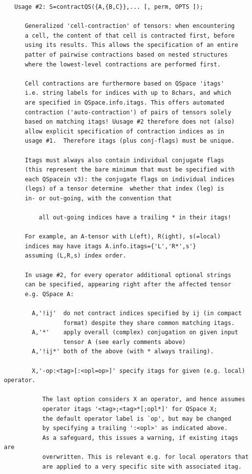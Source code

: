 \documentclass[twoside,12pt]{article}
\begin{document}
\begin{verbatim}
   Usage #2: S=contractQS({A,{B,C}},... [, perm, OPTS ]);
 
      Generalized 'cell-contraction' of tensors: when encountering
      a cell, the content of that cell is contracted first, before
      using its results. This allows the specification of an entire
      patter of pairwise contractions based on nested structures
      where the lowest-level contractions are performed first.
 
      Cell contractions are furthermore based on QSpace 'itags'
      i.e. string labels for indices with up to 8chars, and which
      are specified in QSpace.info.itags. This offers automated
      contraction ('auto-contraction') of pairs of tensors solely
      based on matching itags! Uusage #2 therefore does not (also)
      allow explicit specification of contraction indices as in
      usage #1.  Therefore itags (plus conj-flags) must be unique.
 
      Itags must always also contain individual conjugate flags
      (this represent the bare minimum that must be specified with
      each QSpacein v3): the conjugate flags on individual indices
      (legs) of a tensor determine  whether that index (leg) is
      in- or out-going, with the convention that
 
          all out-going indices have a trailing * in their itags!
 
      For example, an A-tensor with L(eft), R(ight), s(=local)
      indices may have itags A.info.itags={'L','R*',s'}
      assuming (L,R,s) index order.
 
      In usage #2, for every operator additional optional strings
      can be specified, appearing right after the affected tensor
      e.g. QSpace A:
 
        A,'!ij'  do not contract indices specified by ij (in compact
                 format) despite they share common matching itags.
        A,'*'    apply overall (complex) conjugation on given input
                 tensor A (see early comments above)
        A,'!ij*' both of the above (with * always trailing).
 
        X,'-op:<tag>[:<opl=op>]' specify itags for given (e.g. local) operator.
 
           The last option considers X an operator, and hence assumes
           operator itags '<tag>;<tag>*[;opl*]' for QSpace X;
           the default operator label is `op', but may be changed
           by specifying a trailing ':<opl>' as indicated above.
           As a safeguard, this issues a warning, if existing itags are
           overwritten. This is relevant e.g. for local operators that
           are applied to a very specific site with associated itag.
 

\end{verbatim}
\end{document}
